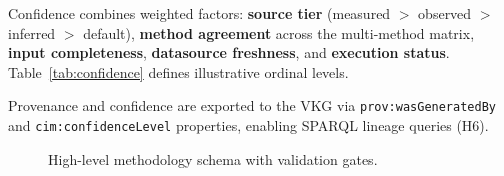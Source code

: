 Confidence combines weighted factors:
\textbf{source tier} (measured $>$ observed $>$ inferred $>$ default),
\textbf{method agreement} across the multi-method matrix,
\textbf{input completeness},
\textbf{datasource freshness},
and \textbf{execution status}.
Table~\ref{tab:confidence} defines illustrative ordinal levels.



Provenance and confidence are exported to the VKG via \texttt{prov:wasGeneratedBy} and \texttt{cim:confidenceLevel} properties, enabling SPARQL lineage queries (H6).

\begin{figure}[t]
  \centering
  \caption{High-level methodology schema with validation gates.}
  \label{fig:methodology}
\end{figure}
